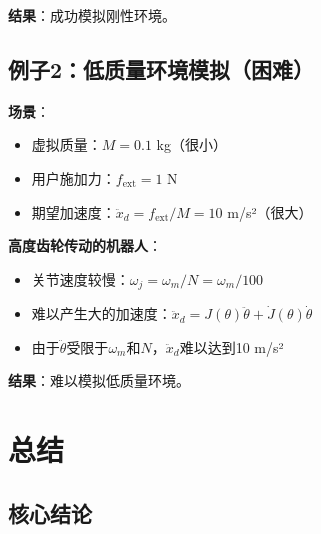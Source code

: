 \documentclass[12pt,a4paper]{article}
\begin{document}
\textbf{结果}：成功模拟刚性环境。

\subsection{例子2：低质量环境模拟（困难）}

\textbf{场景}：
\begin{itemize}
\item 虚拟质量：$M = 0.1$ kg（很小）
\item 用户施加力：$f_{\text{ext}} = 1$ N
\item 期望加速度：$\ddot{x}_d = f_{\text{ext}}/M = 10$ m/s²（很大）
\end{itemize}

\textbf{高度齿轮传动的机器人}：
\begin{itemize}
\item 关节速度较慢：$\omega_j = \omega_m/N = \omega_m/100$
\item 难以产生大的加速度：$\ddot{x}_d = J(\theta)\ddot{\theta} + \dot{J}(\theta)\dot{\theta}$
\item 由于$\ddot{\theta}$受限于$\omega_m$和$N$，$\ddot{x}_d$难以达到10 m/s²
\end{itemize}

\textbf{结果}：难以模拟低质量环境。

\section{总结}

\subsection{核心结论}
\end{document}
